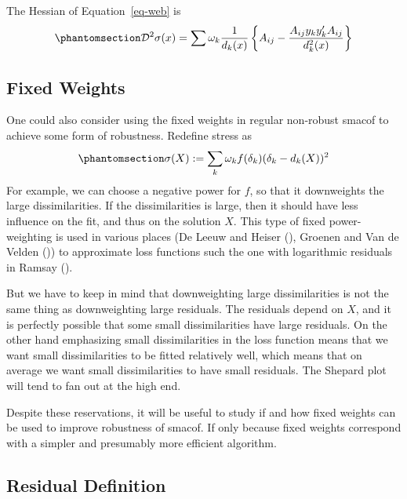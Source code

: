 \documentclass[
  12pt,
  letterpaper,
  DIV=11,
  numbers=noendperiod]{scrartcl}
\theoremstyle{definition}
\theoremstyle{definition}
\theoremstyle{plain}
\theoremstyle{plain}
\theoremstyle{plain}
\theoremstyle{remark}
\begin{document}
The Hessian of Equation~\ref{eq-web} is
\begin{equation}\phantomsection\label{eq-hess}{
\mathcal{D}^2\sigma(x)=\sum\omega_k\frac{1}{d_k(x)}\left\{A_{ij}-\frac{A_{ij}y_ky_k'A_{ij}}{d_k^2(x)}\right\}
}\end{equation}

\subsection{Fixed Weights}\label{fixed-weights}

One could also consider using the fixed weights in regular non-robust
smacof to achieve some form of robustness. Redefine stress as
\begin{equation}\phantomsection\label{eq-wstress}{
\sigma(X):=\sum_k \omega_kf(\delta_k)(\delta_k-d_k(X))^2
}\end{equation} For example, we can choose a negative power for \(f\),
so that it downweights the large dissimilarities. If the dissimilarities
is large, then it should have less influence on the fit, and thus on the
solution \(X\). This type of fixed power-weighting is used in various
places (De Leeuw and Heiser (),
Groenen and Van de Velden ())
to approximate loss functions such the one with logarithmic residuals in
Ramsay ().

But we have to keep in mind that downweighting large dissimilarities is
not the same thing as downweighting large residuals. The residuals
depend on \(X\), and it is perfectly possible that some small
dissimilarities have large residuals. On the other hand emphasizing
small dissimilarities in the loss function means that we want small
dissimilarities to be fitted relatively well, which means that on
average we want small dissimilarities to have small residuals. The
Shepard plot will tend to fan out at the high end.

Despite these reservations, it will be useful to study if and how fixed
weights can be used to improve robustness of smacof. If only because
fixed weights correspond with a simpler and presumably more efficient
algorithm.

\subsection{Residual Definition}\label{residual-definition}
\end{document}
